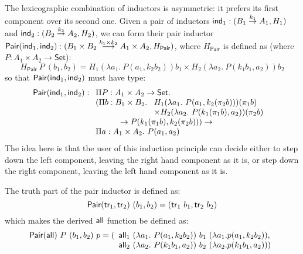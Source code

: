 \documentclass{article}
\newcommand{\Set}{\mathsf{Set}}
\begin{document}
The lexicographic combination of inductors is asymmetric: it prefers
its first component over its second one. Given a pair of inductors
$\mathsf{ind}_1 : (B_1 \stackrel{k_1}\to A_1, H_1)$ and $\mathsf{ind}_2 : (B_2
\stackrel{k_2}\to A_2, H_2)$, we can form their pair inductor
$\mathsf{Pair}(\mathsf{ind}_1, \mathsf{ind}_2) : (B_1 \times B_2 \stackrel{k_1 \times
  k_2}\longrightarrow A_1 \times A_2, H_{\mathsf{Pair}})$, where
$H_{\mathsf{Pair}}$ is defined as (where $P : A_1 \times A_2 \to
\Set$):
\begin{displaymath}
  H_{\mathsf{Pair}}\ P\ (b_1,b_2) = H_1(\lambda a_1.\ P(a_1,k_2b_2))b_1 \times H_2(\lambda a_2.\ P(k_1b_1,a_2))b_2
\end{displaymath}
so that $\mathsf{Pair}(\mathsf{ind}_1, \mathsf{ind}_2)$ must have type:
\begin{displaymath}
  \mathsf{Pair}(\ind_1, \ind_2) :
  \begin{array}[t]{l}
    \Pi P : A_1 \times A_2 \to \Set. \\
        (\Pi b : B_1 \times B_2.\
    \begin{array}[t]{l}
      H_1(\lambda a_1.\ P(a_1, k_2(\pi_2 b)))(\pi_1 b) \\
      \times H_2(\lambda a_2.\ P(k_1(\pi_1b), a_2))(\pi_2 b)
    \end{array} \\
    \quad\quad\quad\to P (k_1 (\pi_1 b), k_2 (\pi_2 b))) \to \\
    \Pi a : A_1 \times A_2.\ P (a_1, a_2)
  \end{array}
\end{displaymath}
The idea here is that the user of this induction principle can decide
either to step down the left component, leaving the right hand
component as it is, or step down the right component, leaving the left
hand component as it is.

The truth part of the pair inductor is defined as:
\begin{displaymath}
  \mathsf{Pair}(\mathsf{tr}_1, \mathsf{tr}_2)\ (b_1, b_2) = (\mathsf{tr}_1\ b_1 , \mathsf{tr}_2\ b_2)
\end{displaymath}
which makes the derived $\mathsf{all}$ function be defined as:
\begin{displaymath}
  \mathsf{Pair}(\mathsf{all})\ P\ (b_1,b_2)\ p = (
  \begin{array}[t]{l}
    \mathsf{all}_1\ (\lambda a_1.\ P(a_1,k_2b_2))\ b_1\ (\lambda a_1. p (a_1,k_2b_2)), \\
    \mathsf{all}_2\ (\lambda a_2.\ P(k_1b_1,a_2))\ b_2\ (\lambda a_2. p (k_1b_1,a_2)))
  \end{array}
\end{displaymath}
\end{document}

